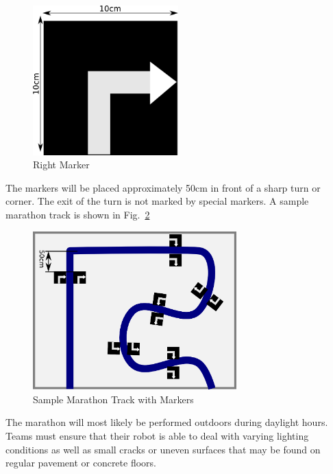 \documentclass[12pt]{hurocup}
\begin{document}
\begin{lawlist}[MR]
\begin{figure}
  \begin{center}
    \includegraphics[width=0.5\textwidth]{Figures/marathon-marker}
  \end{center}
  \caption{Right Marker}
  \label{fig:markers}
\end{figure}

\item The markers will be placed approximately 50cm in front of a
  sharp turn or corner. The exit of the turn is not marked by special
  markers. A sample marathon track is shown in
  Fig.~\ref{fig:marathon-plan}

\begin{figure}
  \begin{center}
    \includegraphics[width=0.7\textwidth]{Figures/marathon-plan}
  \end{center}
  \caption{Sample Marathon Track with Markers}
  \label{fig:marathon-plan}
\end{figure}

\end{lawlist}

\begin{decisions}

\item The marathon will most likely be performed outdoors during
  daylight hours. Teams must ensure that their robot is able to deal
  with varying lighting conditions as well as small cracks or uneven
  surfaces that may be found on regular pavement or concrete floors. 

\end{decisions}
\end{document}
